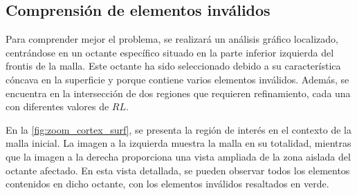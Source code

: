 \subsection{Comprensión de elementos inválidos}

Para comprender mejor el problema, se realizará un análisis gráfico localizado, centrándose en un octante específico situado en la parte inferior izquierda del frontis de la malla. Este octante ha sido seleccionado debido a su característica cóncava en la superficie y porque contiene varios elementos inválidos. Además, se encuentra en la intersección de dos regiones que requieren refinamiento, cada una con diferentes valores de $RL$.

En la \autoref{fig:zoom_cortex_surf}, se presenta la región de interés en el contexto de la malla inicial. La imagen a la izquierda muestra la malla en su totalidad, mientras que la imagen a la derecha proporciona una vista ampliada de la zona aislada del octante afectado. En esta vista detallada, se pueden observar todos los elementos contenidos en dicho octante, con los elementos inválidos resaltados en verde. 



